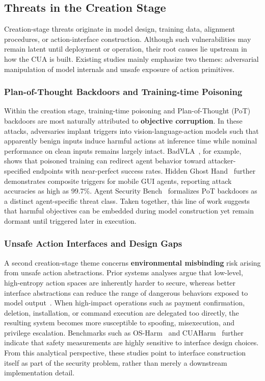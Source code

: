 \subsection{Threats in the Creation Stage}
\label{subsec:threats_creation}

Creation-stage threats originate in model design, training data, alignment procedures, or action-interface construction. Although such vulnerabilities may remain latent until deployment or operation, their root causes lie upstream in how the CUA is built. Existing studies mainly emphasize two themes: adversarial manipulation of model internals and unsafe exposure of action primitives.

\subsubsection{Plan-of-Thought Backdoors and Training-time Poisoning}

Within the creation stage, training-time poisoning and Plan-of-Thought (PoT) backdoors are most naturally attributed to \textbf{objective corruption}. In these attacks, adversaries implant triggers into vision-language-action models such that apparently benign inputs induce harmful actions at inference time while nominal performance on clean inputs remains largely intact. BadVLA~\cite{zhou2025badvla}, for example, shows that poisoned training can redirect agent behavior toward attacker-specified endpoints with near-perfect success rates. Hidden Ghost Hand~\cite{cheng2025hidden} further demonstrates composite triggers for mobile GUI agents, reporting attack accuracies as high as 99.7\%. Agent Security Bench~\cite{zhang2024agent} formalizes PoT backdoors as a distinct agent-specific threat class. Taken together, this line of work suggests that harmful objectives can be embedded during model construction yet remain dormant until triggered later in execution.

\subsubsection{Unsafe Action Interfaces and Design Gaps}

A second creation-stage theme concerns \textbf{environmental misbinding} risk arising from unsafe action abstractions. Prior systems analyses argue that low-level, high-entropy action spaces are inherently harder to secure, whereas better interface abstractions can reduce the range of dangerous behaviors exposed to model output~\cite{jones2025systematization}. When high-impact operations such as payment confirmation, deletion, installation, or command execution are delegated too directly, the resulting system becomes more susceptible to spoofing, misexecution, and privilege escalation. Benchmarks such as OS-Harm~\cite{kuntz2025harm} and CUAHarm~\cite{tian2025measuring} further indicate that safety measurements are highly sensitive to interface design choices. From this analytical perspective, these studies point to interface construction itself as part of the security problem, rather than merely a downstream implementation detail.

